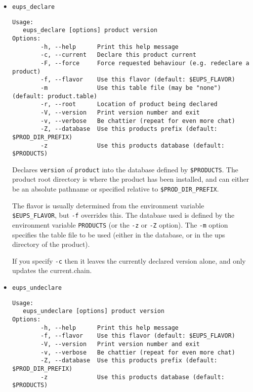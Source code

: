 \documentclass{article}
\begin{document}
\begin{itemize}


\item \texttt{eups\_declare}
\begin{verbatim}
Usage:
   eups_declare [options] product version
Options:
        -h, --help      Print this help message
        -c, --current   Declare this product current
        -F, --force     Force requested behaviour (e.g. redeclare a product)
        -f, --flavor    Use this flavor (default: $EUPS_FLAVOR)
        -m              Use this table file (may be "none") (default: product.table)
        -r, --root      Location of product being declared
        -V, --version   Print version number and exit
        -v, --verbose   Be chattier (repeat for even more chat)
        -Z, --database  Use this products prefix (default: $PROD_DIR_PREFIX)
        -z              Use this products database (default: $PRODUCTS)
\end{verbatim}

Declares \texttt{version} of \texttt{product} into the database defined by \texttt{\$PRODUCTS}.
The product root directory is where the product has been installed, and can either
be an absolute pathname or specified relative to \texttt{\$PROD\_DIR\_PREFIX}.

The flavor is usually determined from the
environment variable \texttt{\$EUPS\_FLAVOR}, but \texttt{-f}
overrides this. The database used is defined by the environment
variable \texttt{PRODUCTS} (or the \texttt{-z} or \texttt{-Z} option).
The \texttt{-m} option specifies the table
file to be used (either in the database, or in the ups directory of the product).

If you specify \texttt{-c} then it leaves the currently declared version alone, and
only updates the current.chain.


  \item \texttt{eups\_undeclare}
\begin{verbatim}
Usage:
   eups_undeclare [options] product version
Options:
        -h, --help      Print this help message
        -f, --flavor    Use this flavor (default: $EUPS_FLAVOR)
        -V, --version   Print version number and exit
        -v, --verbose   Be chattier (repeat for even more chat)
        -Z, --database  Use this products prefix (default: $PROD_DIR_PREFIX)
        -z              Use this products database (default: $PRODUCTS)
\end{verbatim}
  

\end{itemize}
\end{document}
